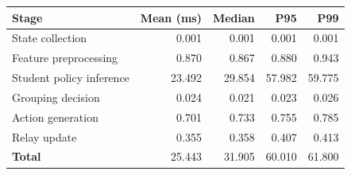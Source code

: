 \begin{tabular}{lrrrr}
\hline
Stage & Mean (ms) & Median & P95 & P99 \\
\hline
State collection & 0.001 & 0.001 & 0.001 & 0.001 \\
Feature preprocessing & 0.870 & 0.867 & 0.880 & 0.943 \\
Student policy inference & 23.492 & 29.854 & 57.982 & 59.775 \\
Grouping decision & 0.024 & 0.021 & 0.023 & 0.026 \\
Action generation & 0.701 & 0.733 & 0.755 & 0.785 \\
Relay update & 0.355 & 0.358 & 0.407 & 0.413 \\
\textbf{Total} & 25.443 & 31.905 & 60.010 & 61.800 \\
\hline
\end{tabular}

